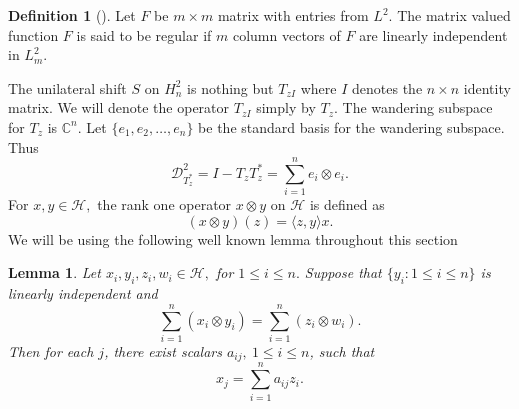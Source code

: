 \documentclass[12pt, reqno]{amsart}
\newtheorem{lemma}[theorem]{Lemma}
\theoremstyle{definition}
\newtheorem{definition}[theorem]{Definition}
\theoremstyle{remark}
\numberwithin{equation}{section}
\begin{document}
    \begin{definition}[\cite{CG}]
        Let $F$ be $m\times m$ matrix with entries from $L^2.$ The matrix valued function $F$ is said to be regular if $m$ column vectors of $F$ are linearly independent in $L^2_m.$
    \end{definition}
    The unilateral shift $S$ on $H^2_n$ is nothing but $T_{zI}$ where $I$ denotes the $n \times n$
    identity matrix. 
    We will denote the operator $T_{zI}$ simply by $T_z$.
    The wandering subspace for $T_{z}$ is $\mathbb{C}^n.$
    Let $\{e_1,e_2,\dots,e_n\}$ be the standard basis for the wandering subspace. Thus
            \begin{equation*}
                \mathcal{D}^2_{T^*_z}=I-T_zT_z^*=\sum_{i=1}^{n} e_i\otimes e_i.
            \end{equation*}
    For $x,y \in \mathcal{H},$ the rank one operator $ x\otimes y$ on $\mathcal{H}$ is defined as 
    $$
        (x\otimes y) (z)=\langle z, y\rangle x.
    $$
    We will be using the following well known lemma throughout this section
    \begin{lemma}\label{Tensor lemma}
       Let $x_i,y_i,z_i,w_i \in \mathcal{H},$ for $1 \leq i\leq n.$ Suppose that $\{y_i: 1\leq i \leq n\}$ is linearly independent and
        $$
            \sum_{i=1}^{n}(x_i \otimes y_i)=\sum_{i=1}^{n} (z_i \otimes w_i).
        $$
        Then for each $j$, there exist scalars $a_{ij},~ 1 \leq i \leq n$, such that 
        $$
            x_j=\sum_{i=1}^{n} a_{ij}z_i.
        $$
     \end{lemma}
    
\end{document}
